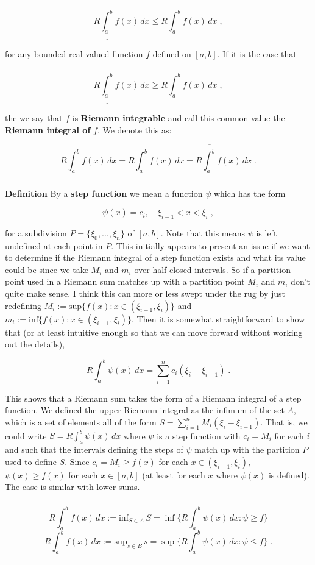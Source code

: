 \documentclass[a4paper]{article}
\begin{document}
$$R\underline{\int_a^b} f(x) \, dx \leq R\overline{\int_a^b} f(x) \, dx \;,$$

for any bounded real valued function $f$ defined on $[a,b]$. If it is the case that 

$$R\underline{\int_a^b} f(x) \, dx \geq R\overline{\int_a^b} f(x) \, dx \;, $$

the we say that $f$ is {\bf Riemann integrable} and call this common value the {\bf Riemann integral of } $f$. We denote this as:

$$ R\int_a^b f(x) \, dx = R\underline{\int_a^b} f(x) \, dx =  R\overline{\int_a^b} f(x) \, dx \;.$$

{\bf Definition} By a {\bf step function} we mean a function $\psi$ which has the form 

$$\psi(x) = c_i, \quad \xi_{i-1} < x < \xi_i \;, $$

for a subdivision $P = \{\xi_0, ... , \xi_n\}$ of $[a,b]$. Note that this means $\psi$ is left undefined at each point in $P$. This initially appears to present an issue if we want to determine if the Riemann integral of a step function exists and what its value could be since we take $M_i$ and $m_i$ over half closed intervals. So if a partition point used in a Riemann sum matches up with a partition point $M_i$ and $m_i$ don't quite make sense. I think this can more or less swept under the rug by just redefining $M_i := \text{sup}\{f(x) : x \in (\xi_{i-1}, \xi_{i}) \}$ and $m_i := \text{inf}\{f(x) : x \in (\xi_{i-1}, \xi_{i}) \}$. Then it is somewhat straightforward to show that (or at least intuitive enough so that we can move forward without working out the details),

$$R\int_a^b \psi(x) \, dx = \sum_{i=1}^n c_i (\xi_i - \xi_{i-1} ) \;.$$

This shows that a Riemann sum takes the form of a Riemann integral of a step function. We defined the upper Riemann integral as the infimum of the set $A$, which is a set of elements all of the form $S = \sum_{i=1}^n M_i(\xi_i - \xi_{i-1})$. That is, we could write $S = R\int_a^b \psi(x) \, dx$ where $\psi$ is a step function with $c_i = M_i$ for each $i$ and such that the intervals defining the steps of $\psi$ match up with the partition $P$ used to define $S$. Since $c_i = M_i \geq f(x)$ for each $x \in (\xi_{i-1}, \xi_{i})$, $\psi(x) \geq f(x)$ for each $x \in [a,b]$ (at least for each $x$ where $\psi(x)$ is defined). The case is similar with lower sums.

$$R\overline{\int_a^b} f(x) \, dx := \text{inf}_{S \in A} \, S = \inf \{R \int_a^b \psi(x) \, dx : \psi \geq f\}$$
$$R\underline{\int_a^b} f(x) \, dx := \text{sup}_{s \in B} \, s = \sup \{R \int_a^b \psi(x) \, dx : \psi \leq f\} \;.$$
\end{document}
